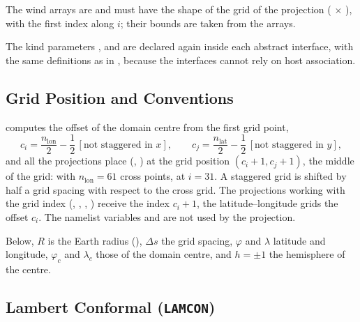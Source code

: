 The wind arrays are  and must have the shape of
the grid of the projection ( $\times$ ), with the
first index along $i$; their bounds are taken from the arrays.

The kind parameters ,  and  are declared
again inside each abstract interface, with the same definitions as in
, because the interfaces cannot rely on host
association.

\subsection{Grid Position and Conventions}
\label{subsec:proj_grid}

 computes the offset of the domain centre from the first
grid point,
\[
  c_i = \frac{n_\text{lon}}{2} - \frac{1}{2}\,[\text{not staggered in } x],
  \qquad
  c_j = \frac{n_\text{lat}}{2} - \frac{1}{2}\,[\text{not staggered in } y],
\]
and all the projections place (, ) at the grid
position $(c_i + 1, c_j + 1)$, the middle of the grid: with
$n_\text{lon} = 61$ cross points, at $i = 31$. A staggered grid is shifted by
half a grid spacing with respect to the cross grid. The projections working
with the grid index (, , ,
) receive the index $c_i + 1$, the latitude--longitude grids
the offset $c_i$. The namelist variables
 and  are not used by the projection.

Below, $R$ is the Earth radius (), $\Delta s$ the grid
spacing, $\varphi$ and $\lambda$ latitude and longitude, $\varphi_c$ and
$\lambda_c$ those of the domain centre, and $h = \pm1$ the hemisphere of
the centre.

\subsection{Lambert Conformal (\texttt{LAMCON})}
\label{subsec:proj_lambert}

